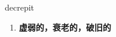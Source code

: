
\begin{frame}
{\huge decrepit}
\begin{center}
\begin{enumerate}\Large
  \item \textbf{虚弱的，衰老的，破旧的}
\end{enumerate}
\end{center}
\end{frame}
